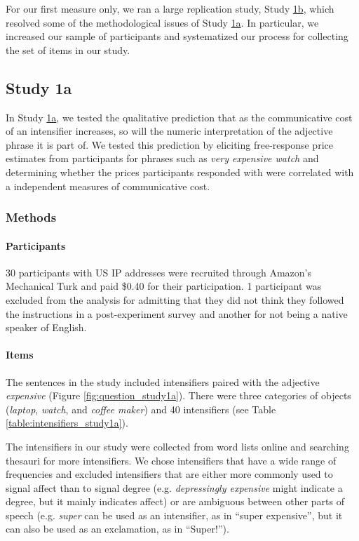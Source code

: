 \documentclass[10pt,letterpaper]{article}
\newcommand{\w}[1]{\emph{#1}}
\begin{document}
For our first measure only, we ran a large replication study, Study \hyperref[sec:study1b]{1b}, which resolved some of the methodological issues of Study \hyperref[sec:study1a]{1a}.
In particular, we increased our sample of participants and systematized our process for collecting the set of items in our study.

\subsection{Study 1a \label{sec:study1a}}

In Study \hyperref[sec:study1a]{1a}, we tested the qualitative prediction that as the communicative cost of an intensifier increases, so will the numeric interpretation of the adjective phrase it is part of.
We tested this prediction by eliciting free-response price estimates from participants for phrases such as \w{very expensive watch} and determining whether the prices participants responded with were correlated with a independent measures of communicative cost.

\subsubsection{Methods}

\paragraph{Participants}

30 participants with US IP addresses were recruited through Amazon’s Mechanical Turk and paid \$0.40 for their participation. 1 participant was excluded from the analysis for admitting that they did not think they followed the instructions in a post-experiment survey and another for not being a native speaker of English.

\paragraph{Items}

The sentences in the study included intensifiers paired with the adjective \w{expensive} (Figure \ref{fig:question_study1a}).
There were three categories of objects (\w{laptop}, \w{watch}, and \w{coffee maker}) and 40 intensifiers (see Table \ref{table:intensifiers_study1a}).

The intensifiers in our study were collected from word lists online and searching thesauri for more intensifiers.
We chose intensifiers that have a wide range of frequencies and excluded intensifiers that are either more commonly used to signal affect than to signal degree (e.g. \w{depressingly expensive} might indicate a degree, but it mainly indicates affect) or are ambiguous between other parts of speech (e.g. \w{super} can be used as an intensifier, as in ``super expensive'', but it can also be used as an exclamation, as in ``Super!'').
\end{document}

